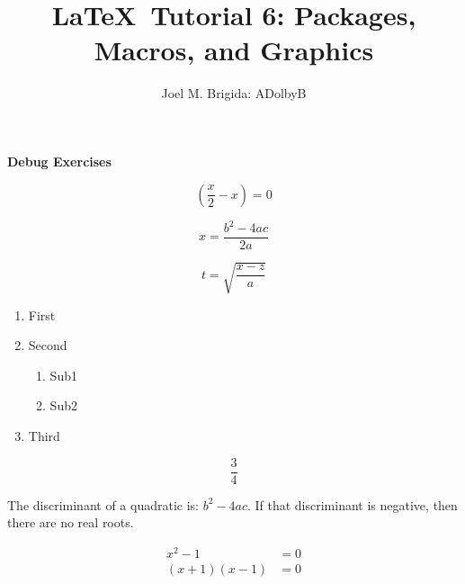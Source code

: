 \documentclass[11pt, letterpaper]{article}
\title{\LaTeX\ Tutorial 6: Packages, Macros, and Graphics}
\author{Joel M. Brigida: ADolbyB}
\date{} %
\begin{document}
\maketitle
\thispagestyle{empty} %

\pagebreak
\setcounter{page}{1} %
\begin{center}
    \textbf{Debug Exercises}
\end{center}

$$\left( \frac{x}{2} - x \right) = 0$$ %

$$x = \frac{b^2-4ac}{2a}$$ %

$$t = \sqrt{\frac{x-z}{a}}$$ %

\begin{enumerate}
\item First
\item Second
	\begin{enumerate}
	\item Sub1
	\item Sub2
    \end{enumerate} %
\item Third
\end{enumerate}

$$\frac{3}{4}$$ %

The discriminant of a quadratic is: $b^2 - 4ac$.  If that discriminant
is negative, then there are no real roots.

\begin{align*} %
    x^2-1 &=0 \\ %
    (x+1)(x-1) &= 0
\end{align*} %
\end{document}
